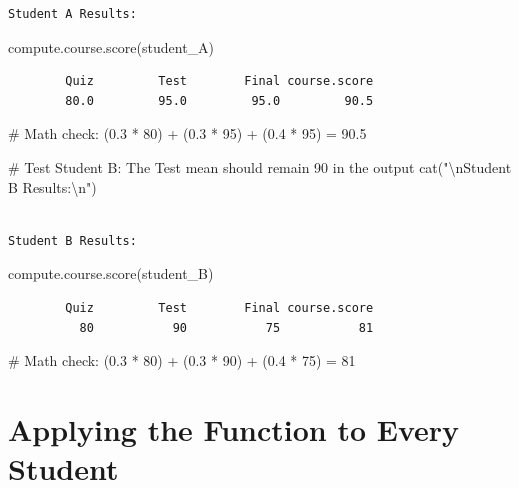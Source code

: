 \documentclass[
  letterpaper,
  DIV=11,
  numbers=noendperiod]{scrreprt}
\newenvironment{Shaded}{\begin{snugshade}}{\end{snugshade}}
\newcommand{\CommentTok}[1]{\textcolor[rgb]{0.37,0.37,0.37}{#1}}
\newcommand{\FunctionTok}[1]{\textcolor[rgb]{0.28,0.35,0.67}{#1}}
\newcommand{\NormalTok}[1]{\textcolor[rgb]{0.00,0.23,0.31}{#1}}
\newcommand{\SpecialCharTok}[1]{\textcolor[rgb]{0.37,0.37,0.37}{#1}}
\newcommand{\StringTok}[1]{\textcolor[rgb]{0.13,0.47,0.30}{#1}}
\begin{document}
\begin{verbatim}
Student A Results:
\end{verbatim}

\begin{Shaded}
\begin{Highlighting}[]
\FunctionTok{compute.course.score}\NormalTok{(student\_A)}
\end{Highlighting}
\end{Shaded}

\begin{verbatim}
        Quiz         Test        Final course.score 
        80.0         95.0         95.0         90.5 
\end{verbatim}

\begin{Shaded}
\begin{Highlighting}[]
\CommentTok{\# Math check: (0.3 * 80) + (0.3 * 95) + (0.4 * 95) = 90.5}

\CommentTok{\# Test Student B: The Test mean should remain 90 in the output}
\FunctionTok{cat}\NormalTok{(}\StringTok{"}\SpecialCharTok{\textbackslash{}n}\StringTok{Student B Results:}\SpecialCharTok{\textbackslash{}n}\StringTok{"}\NormalTok{)}
\end{Highlighting}
\end{Shaded}

\begin{verbatim}

Student B Results:
\end{verbatim}

\begin{Shaded}
\begin{Highlighting}[]
\FunctionTok{compute.course.score}\NormalTok{(student\_B)}
\end{Highlighting}
\end{Shaded}

\begin{verbatim}
        Quiz         Test        Final course.score 
          80           90           75           81 
\end{verbatim}

\begin{Shaded}
\begin{Highlighting}[]
\CommentTok{\# Math check: (0.3 * 80) + (0.3 * 90) + (0.4 * 75) = 81}
\end{Highlighting}
\end{Shaded}

\section{Applying the Function to Every
Student}\label{applying-the-function-to-every-student}
\end{document}

